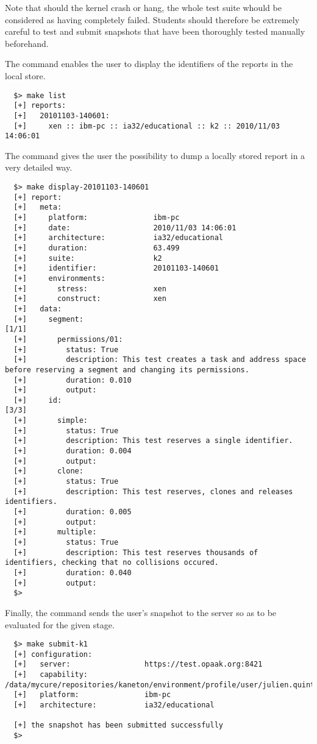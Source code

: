 Note that should the kernel crash or hang, the whole test suite whould be
considered as having completely failed. Students should therefore be extremely
careful to test and submit snapshots that have been thoroughly tested manually
beforehand.

The  command enables the user to display the identifiers of the
reports in the local store.

\begin{verbatim}
  $> make list
  [+] reports:
  [+]   20101103-140601:
  [+]     xen :: ibm-pc :: ia32/educational :: k2 :: 2010/11/03 14:06:01
\end{verbatim}

The  command gives the user the possibility to dump a locally
stored report in a very detailed way.

\begin{verbatim}
  $> make display-20101103-140601
  [+] report:
  [+]   meta:
  [+]     platform:               ibm-pc
  [+]     date:                   2010/11/03 14:06:01
  [+]     architecture:           ia32/educational
  [+]     duration:               63.499
  [+]     suite:                  k2
  [+]     identifier:             20101103-140601
  [+]     environments:
  [+]       stress:               xen
  [+]       construct:            xen
  [+]   data:
  [+]     segment:                                                        [1/1]
  [+]       permissions/01:
  [+]         status: True
  [+]         description: This test creates a task and address space before reserving a segment and changing its permissions.
  [+]         duration: 0.010
  [+]         output: 
  [+]     id:                                                             [3/3]
  [+]       simple:
  [+]         status: True
  [+]         description: This test reserves a single identifier.
  [+]         duration: 0.004
  [+]         output: 
  [+]       clone:
  [+]         status: True
  [+]         description: This test reserves, clones and releases identifiers.
  [+]         duration: 0.005
  [+]         output: 
  [+]       multiple:
  [+]         status: True
  [+]         description: This test reserves thousands of identifiers, checking that no collisions occured.
  [+]         duration: 0.040
  [+]         output: 
  $> 
\end{verbatim}

Finally, the  command sends the user's snapshot to the server
so as to be evaluated for the given stage.

\begin{verbatim}
  $> make submit-k1
  [+] configuration:
  [+]   server:                 https://test.opaak.org:8421
  [+]   capability:             /data/mycure/repositories/kaneton/environment/profile/user/julien.quintard/julien.quintard.cap
  [+]   platform:               ibm-pc
  [+]   architecture:           ia32/educational

  [+] the snapshot has been submitted successfully
  $> 
\end{verbatim}
